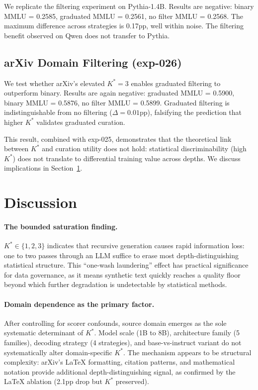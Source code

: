 \documentclass[11pt,a4paper]{article}
\begin{document}
We replicate the filtering experiment on Pythia-1.4B. Results are negative: binary MMLU = 0.2585, graduated MMLU = 0.2561, no filter MMLU = 0.2568. The maximum difference across strategies is 0.17pp, well within noise. The filtering benefit observed on Qwen does not transfer to Pythia.

\subsection{arXiv Domain Filtering (exp-026)}

We test whether arXiv's elevated $K^* = 3$ enables graduated filtering to outperform binary. Results are again negative: graduated MMLU = 0.5900, binary MMLU = 0.5876, no filter MMLU = 0.5899. Graduated filtering is indistinguishable from no filtering ($\Delta = 0.01$pp), falsifying the prediction that higher $K^*$ validates graduated curation.

This result, combined with exp-025, demonstrates that the theoretical link between $K^*$ and curation utility does not hold: statistical discriminability (high $K^*$) does not translate to differential training value across depths. We discuss implications in Section~\ref{sec:discussion}.

\section{Discussion}
\label{sec:discussion}

\paragraph{The bounded saturation finding.}
$K^* \in \{1, 2, 3\}$ indicates that recursive generation causes rapid information loss: one to two passes through an LLM suffice to erase most depth-distinguishing statistical structure. This ``one-wash laundering'' effect has practical significance for data governance, as it means synthetic text quickly reaches a quality floor beyond which further degradation is undetectable by statistical methods.

\paragraph{Domain dependence as the primary factor.}
After controlling for scorer confounds, source domain emerges as the sole systematic determinant of $K^*$. Model scale (1B to 8B), architecture family (5 families), decoding strategy (4 strategies), and base-vs-instruct variant do not systematically alter domain-specific $K^*$. The mechanism appears to be structural complexity: arXiv's LaTeX formatting, citation patterns, and mathematical notation provide additional depth-distinguishing signal, as confirmed by the LaTeX ablation (2.1pp drop but $K^*$ preserved).
\end{document}
